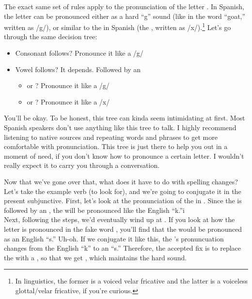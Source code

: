 The exact same set of rules apply to the pronunciation of the letter . In Spanish, the letter  can be pronounced either as a hard ``g'' sound (like in the word ``goat,'' written as /g/), or similar to the  in Spanish (the , written as /x/).\footnote{In linguistics, the former is a voiced velar fricative and the latter is a voiceless glottal/velar fricative, if you're curious.} Let's go through the same decision tree: 
\begin{itemize}[noitemsep]
	\item Consonant follows? Pronounce it like a /g/ 
	\item Vowel follows? It depends. Followed by an 
		\begin{itemize}[noitemsep]
			\item {} or ? Pronounce it like a /g/
			\item {} or ? Pronounce it like a /x/
		\end{itemize}
\end{itemize}

\begin{conf}{You'll be okay. }
To be honest, this tree can kinda seem intimidating at first. Most Spanish speakers don't use anything like this tree to talk. I highly recommend listening to native sources and repeating words and phrases to get more comfortable with pronunciation. This tree is just there to help you out in a moment of need, if you don't know how to pronounce a certain letter. I wouldn't really expect it to carry you through a conversation.
\end{conf}

Now that we've gone over that, what does it have to do with spelling changes?\\

Let's take the example verb  (to look for), and we're going to conjugate it in the present subjunctive. 
First, let's look at the pronunciation of the  in . Since the  is followed by an , the  will be pronounced like the English ``k.''i\\

Next, following the steps, we'd eventually wind up at \sout{}. If you look at how the letter  is pronounced in the fake word \sout{}, you'll find that the  would be pronounced as an English ``s.'' Uh-oh. If we conjugate it like this, the 's pronuncuation changes from the English ``k'' to an ``s.'' Therefore, the accepted fix is to replace the  with a , so that we get , which maintains the hard  sound. \\

